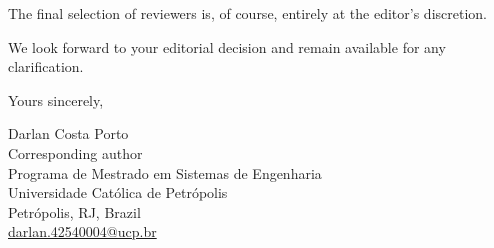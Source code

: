 \documentclass[11pt,a4paper]{article}
\begin{document}
The final selection of reviewers is, of course, entirely at the
editor's discretion.

We look forward to your editorial decision and remain available for
any clarification.

\bigskip

\noindent Yours sincerely,

\bigskip\bigskip

\noindent Darlan Costa Porto\\
Corresponding author\\
Programa de Mestrado em Sistemas de Engenharia\\
Universidade Cat\'olica de Petr\'opolis\\
Petr\'opolis, RJ, Brazil\\
\href{mailto:darlan.42540004@ucp.br}{darlan.42540004@ucp.br}
\end{document}
